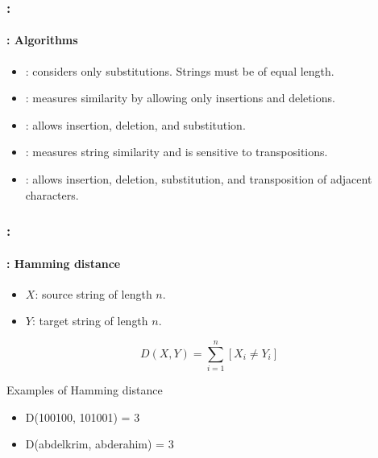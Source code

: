 \documentclass[xcolor=table]{beamer}
\begin{document}
\begin{frame}
	\frametitle{\insertshortsubtitle: \insertsection}
	\framesubtitle{\insertsubsection: Algorithms}
	
	\begin{itemize}
		\item {}: considers only substitutions. Strings must be of equal length.
		\item {}: measures similarity by allowing only insertions and deletions.
		\item {}: allows insertion, deletion, and substitution.
		\item {}: measures string similarity and is sensitive to transpositions.
		\item {}: allows insertion, deletion, substitution, and transposition of adjacent characters.
	\end{itemize}

\end{frame}


\begin{frame}
	\frametitle{\insertshortsubtitle: \insertsection}
	\framesubtitle{\insertsubsection: Hamming distance}
	
	\begin{itemize}
		\item $X$: source string of length $n$.
		\item $Y$: target string of length $n$.
	\end{itemize}
	
	\[
	D(X,Y) = \sum_{i=1}^{n} [X_i \ne Y_i]
	\]
	
	
	\begin{exampleblock}{Examples of Hamming distance}
		\begin{itemize}
			\item D(100100, 101001) = 3
			\item D(abdelkrim, abderahim) = 3
		\end{itemize}
	\end{exampleblock}
	
\end{frame}
\end{document}

